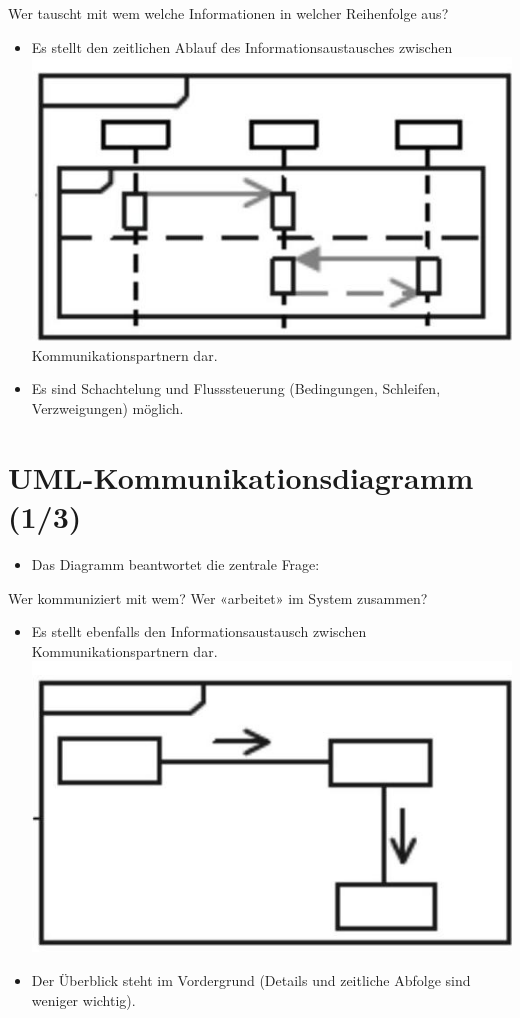 \documentclass[10pt]{article}
\begin{document}
Wer tauscht mit wem welche Informationen in welcher Reihenfolge aus?

\begin{itemize}
  \item Es stellt den zeitlichen Ablauf des Informationsaustausches zwischen\\
\includegraphics[max width=\textwidth]{2025_01_02_787afb9584031d2940deg-15} Kommunikationspartnern dar.
  \item Es sind Schachtelung und Flusssteuerung (Bedingungen, Schleifen, Verzweigungen) möglich.
\end{itemize}

\section*{UML-Kommunikationsdiagramm (1/3)}
\begin{itemize}
  \item Das Diagramm beantwortet die zentrale Frage:
\end{itemize}

Wer kommuniziert mit wem? Wer «arbeitet» im System zusammen?

\begin{itemize}
  \item Es stellt ebenfalls den Informationsaustausch zwischen Kommunikationspartnern dar.\\
\includegraphics[max width=\textwidth, center]{2025_01_02_787afb9584031d2940deg-16}
  \item Der Überblick steht im Vordergrund (Details und zeitliche Abfolge sind weniger wichtig).
\end{itemize}
\end{document}
